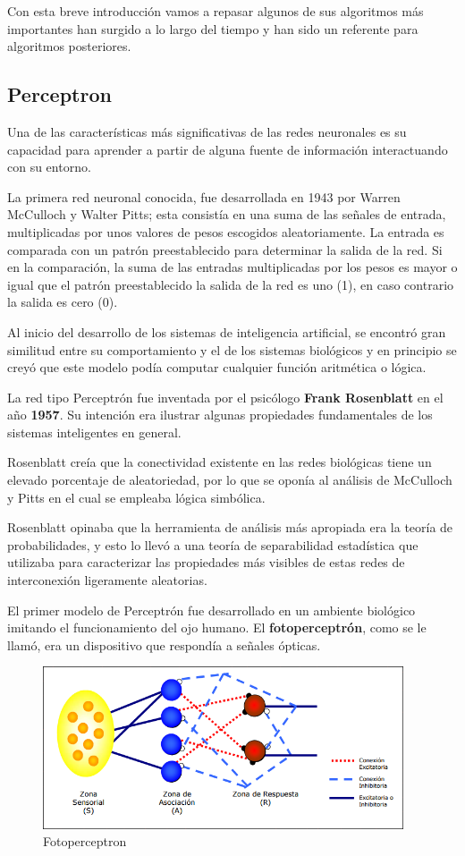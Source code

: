 \documentclass[a4paper, 11pt]{article} %
\begin{document}
Con esta breve introducción vamos a repasar algunos de sus algoritmos más importantes han surgido a lo largo del tiempo y han sido un referente para algoritmos posteriores.  

\subsection{Perceptron}
Una de las características más significativas de las redes neuronales es su capacidad para aprender a partir de alguna fuente de información interactuando con su entorno.

La primera red neuronal conocida, fue desarrollada en 1943 por Warren McCulloch y Walter Pitts; esta consistía en una suma de las señales de entrada, multiplicadas por unos valores de pesos escogidos aleatoriamente. La entrada es comparada con un patrón preestablecido para determinar la salida de la red. Si en la comparación, la suma de las entradas multiplicadas por los pesos es mayor o igual que el patrón preestablecido la salida de la red es uno (1), en caso contrario la salida es cero (0).

Al inicio del desarrollo de los sistemas de inteligencia artificial, se encontró gran similitud entre su comportamiento y el de los sistemas biológicos y en principio se creyó que este modelo podía computar cualquier función aritmética o lógica.

La red tipo Perceptrón fue inventada por el psicólogo \textbf{Frank Rosenblatt} en el año \textbf{1957}. Su intención era ilustrar algunas propiedades fundamentales de los sistemas inteligentes en general.

Rosenblatt creía que la conectividad existente en las redes biológicas tiene un elevado porcentaje de aleatoriedad, por lo que se oponía al análisis de McCulloch y Pitts en el cual se empleaba lógica simbólica.

Rosenblatt opinaba que la herramienta de análisis más apropiada era la teoría de probabilidades, y esto lo llevó a una teoría de separabilidad estadística que utilizaba para caracterizar las propiedades más visibles de estas redes de interconexión ligeramente aleatorias.

El primer modelo de Perceptrón fue desarrollado en un ambiente biológico imitando el funcionamiento del ojo humano. El \textbf{fotoperceptrón}, como se le llamó, era un dispositivo que respondía a señales ópticas.

\begin{figure}[H]
\centering
\includegraphics[width=0.95\textwidth]{Fotoperceptron.PNG}
\caption{Fotoperceptron}
\label{Fotoperceptron}
\end{figure}
\end{document}
